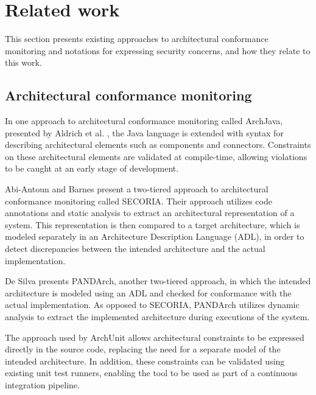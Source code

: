\section{Related work}
This section presents existing approaches to architectural conformance monitoring and notations for expressing security concerns, and how they relate to this work.

\subsection{Architectural conformance monitoring}

In one approach to architectural conformance monitoring called ArchJava, presented by Aldrich et al. \cite{aldrich_archjava_2002}, the Java language is extended with syntax for describing architectural elements such as components and connectors. Constraints on these architectural elements are validated at compile-time, allowing violations to be caught at an early stage of development.

Abi-Antoun and Barnes \cite{abi-antoun_analyzing_2010} present a two-tiered approach to architectural conformance monitoring called SECORIA. Their approach utilizes code annotations and static analysis to extract an architectural representation of a system. This representation is then compared to a target architecture, which is modeled separately in an Architecture Description Language (ADL), in order to detect discrepancies between the intended architecture and the actual implementation.

De Silva \cite{de_silva_towards_2014} presents PANDArch, another two-tiered approach, in which the intended architecture is modeled using an ADL and checked for conformance with the actual implementation. As opposed to SECORIA, PANDArch utilizes dynamic analysis to extract the implemented architecture during executions of the system. 

The approach used by ArchUnit allows architectural constraints to be expressed directly in the source code, replacing the need for a separate model of the intended architecture. In addition, these constraints can be validated using existing unit test runners, enabling the tool to be used as part of a continuous integration pipeline.





